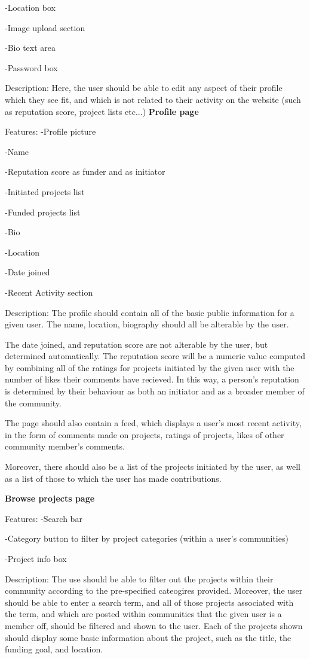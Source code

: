 \documentclass[12pt]{article}
\begin{document}
\begin{enumerate}
-Location box

-Image upload section

-Bio text area

-Password box

Description:
Here, the user should be able to edit any aspect of their profile which they see fit, and which is not related to their activity
on the website (such as reputation score, project lists etc...)
\textbf{Profile page}

Features:
-Profile picture

-Name

-Reputation score as funder and as initiator

-Initiated projects list

-Funded projects list

-Bio

-Location

-Date joined

-Recent Activity section

Description:
The profile should contain all of the basic public information for a given user. The name, location, biography should all be
alterable by the user.

The date joined, and reputation score are not alterable by the user, but determined automatically.
The reputation score will be a numeric value computed by combining all of the ratings for projects initiated by the given user with 
the number of likes their comments have recieved. In this way, a person's reputation is determined by their behaviour as both an initiator
and as a broader member of the community.

The page should also contain a feed, which displays a user's most recent activity, in the form of comments made on projects, ratings of projects,
likes of other community member's comments.

Moreover, there should also be a list of the projects initiated by the user, as well as a list of those to which the user has made contributions.

\textbf{Browse projects page}

Features:
-Search bar

-Category button to filter by project categories (within a user's communities)

-Project info box

Description:
The use should be able to filter out the projects within their community according to the pre-specified cateogires provided.
Moreover, the user should be able to enter a search term, and all of those projects associated with the term, 
and which are posted within communities
that the given user is a member off, should be filtered and shown to the user.
Each of the projects shown should display some basic information about the project, such as the title, the funding goal, and location.


\end{enumerate}
\end{document}

